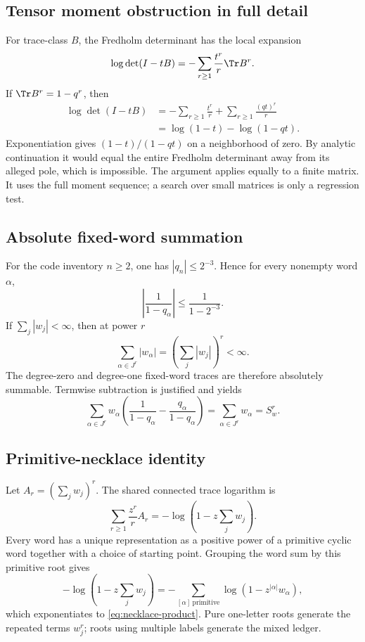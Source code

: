 \subsection{Tensor moment obstruction in full detail}

For trace-class \(B\), the Fredholm determinant has the local expansion
\[
 \log\det(I-tB)=-\sum_{r\ge1}\frac{t^r}{r}\Tr B^r.
\]
If \(\Tr B^r=1-q^r\), then
\begin{align*}
 \log\det(I-tB)
 &=-\sum_{r\ge1}\frac{t^r}{r}
   +\sum_{r\ge1}\frac{(qt)^r}{r}\\
 &=\log(1-t)-\log(1-qt).
\end{align*}
Exponentiation gives \((1-t)/(1-qt)\) on a neighborhood of zero.  By
analytic continuation it would equal the entire Fredholm determinant away
from its alleged pole, which is impossible.  The argument applies equally
to a finite matrix.  It uses the full moment sequence; a search over small
matrices is only a regression test.

\subsection{Absolute fixed-word summation}

For the code inventory \(n\ge2\), one has \(|q_n|\le2^{-3}\).  Hence for
every nonempty word \(\alpha\),
\[
 \left|\frac1{1-q_\alpha}\right|
 \le\frac1{1-2^{-3}}.
\]
If \(\sum_j|w_j|<\infty\), then at power \(r\)
\[
 \sum_{\alpha\in J^r}|w_\alpha|
 =\left(\sum_j|w_j|\right)^r<\infty.
\]
The degree-zero and degree-one fixed-word traces are therefore absolutely
summable.  Termwise subtraction is justified and yields
\[
 \sum_{\alpha\in J^r}
 w_\alpha\left(\frac1{1-q_\alpha}
 -\frac{q_\alpha}{1-q_\alpha}\right)
 =\sum_{\alpha\in J^r}w_\alpha=S_w^r.
\]

\subsection{Primitive-necklace identity}

Let \(A_r=(\sum_jw_j)^r\).  The shared connected trace logarithm is
\[
 \sum_{r\ge1}\frac{z^r}{r}A_r
 =-\log\left(1-z\sum_jw_j\right).
\]
Every word has a unique representation as a positive power of a primitive
cyclic word together with a choice of starting point.  Grouping the word sum
by this primitive root gives
\[
 -\log\left(1-z\sum_jw_j\right)
 =-\sum_{[\alpha]\ \mathrm{primitive}}
   \log(1-z^{|\alpha|}w_\alpha),
\]
which exponentiates to \eqref{eq:necklace-product}.  Pure one-letter roots
generate the repeated terms \(w_j^r\); roots using multiple labels generate
the mixed ledger.

